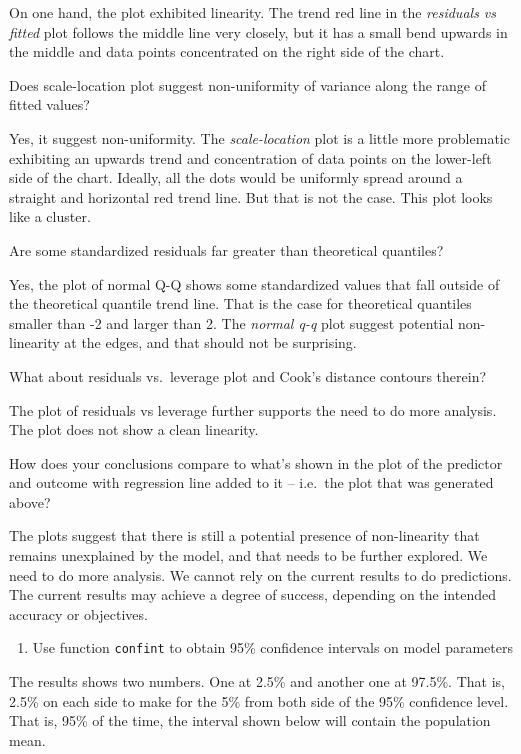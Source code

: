 \documentclass[
]{article}
\providecommand{\tightlist}{%
  \setlength{\itemsep}{0pt}\setlength{\parskip}{0pt}}
\begin{document}
On one hand, the plot exhibited linearity. The trend red line in the
\emph{residuals vs fitted} plot follows the middle line very closely,
but it has a small bend upwards in the middle and data points
concentrated on the right side of the chart.

Does scale-location plot suggest non-uniformity of variance along the
range of fitted values?

Yes, it suggest non-uniformity. The \emph{scale-location} plot is a
little more problematic exhibiting an upwards trend and concentration of
data points on the lower-left side of the chart. Ideally, all the dots
would be uniformly spread around a straight and horizontal red trend
line. But that is not the case. This plot looks like a cluster.

Are some standardized residuals far greater than theoretical quantiles?

Yes, the plot of normal Q-Q shows some standardized values that fall
outside of the theoretical quantile trend line. That is the case for
theoretical quantiles smaller than -2 and larger than 2. The
\emph{normal q-q} plot suggest potential non-linearity at the edges, and
that should not be surprising.

What about residuals vs.~leverage plot and Cook's distance contours
therein?

The plot of residuals vs leverage further supports the need to do more
analysis. The plot does not show a clean linearity.

How does your conclusions compare to what's shown in the plot of the
predictor and outcome with regression line added to it -- i.e.~the plot
that was generated above?

The plots suggest that there is still a potential presence of
non-linearity that remains unexplained by the model, and that needs to
be further explored. We need to do more analysis. We cannot rely on the
current results to do predictions. The current results may achieve a
degree of success, depending on the intended accuracy or objectives.

\begin{enumerate}
\def\labelenumi{\arabic{enumi}.}
\setcounter{enumi}{4}
\tightlist
\item
  Use function \texttt{confint} to obtain 95\% confidence intervals on
  model parameters
\end{enumerate}

The results shows two numbers. One at 2.5\% and another one at 97.5\%.
That is, 2.5\% on each side to make for the 5\% from both side of the
95\% confidence level. That is, 95\% of the time, the interval shown
below will contain the population mean.
\end{document}
